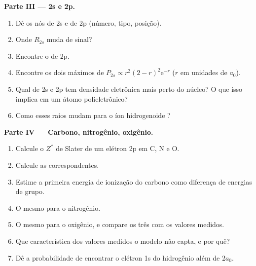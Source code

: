 \begin{problem}
\medskip
\noindent\textbf{Parte III --- 2s e 2p.}
\begin{enumerate}[resume]
  \item Dê os nós de 2s e de 2p (número, tipo, posição).
  \item Onde $R_{2s}$ muda de sinal?
  \item Encontre o  de 2p.
  \item Encontre os dois máximos de $P_{2s} \propto r^2(2 - r)^2\mathrm e^{-r}$ ($r$ em unidades de
        $a_0$).
  \item Qual de 2s e 2p tem densidade eletrônica mais perto do núcleo? O que
        isso implica em um átomo polieletrônico?
  \item Como esses raios mudam para o íon hidrogenoide ?
\end{enumerate}

\medskip
\noindent\textbf{Parte IV --- Carbono, nitrogênio, oxigênio.}
\begin{enumerate}[resume]
  \item Calcule o $Z^*$ de Slater de um elétron 2p em C, N e O.
  \item Calcule as  correspondentes.
  \item Estime a primeira energia de ionização do carbono como diferença de
        energias de grupo.
  \item O mesmo para o nitrogênio.
  \item O mesmo para o oxigênio, e compare os três com os valores medidos.
  \item Que característica dos valores medidos o modelo não capta, e por quê?
  \item Dê a probabilidade de encontrar o elétron 1s do hidrogênio além de
        $2a_0$.
\end{enumerate}
\end{problem}
